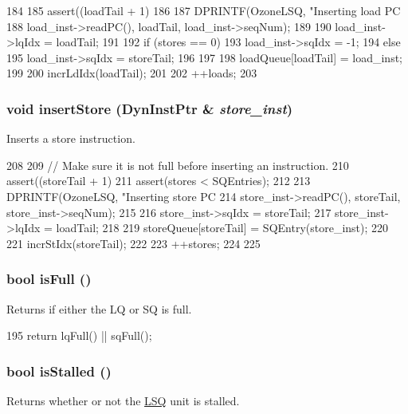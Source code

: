 \begin{DoxyCode}
184 {
185     assert((loadTail + 1) %
186 
187     DPRINTF(OzoneLSQ, "Inserting load PC %
188             load_inst->readPC(), loadTail, load_inst->seqNum);
189 
190     load_inst->lqIdx = loadTail;
191 
192     if (stores == 0) {
193         load_inst->sqIdx = -1;
194     } else {
195         load_inst->sqIdx = storeTail;
196     }
197 
198     loadQueue[loadTail] = load_inst;
199 
200     incrLdIdx(loadTail);
201 
202     ++loads;
203 }
\end{DoxyCode}
\hypertarget{classOzoneLSQ_a6a4b4e51bfff3639932ebaba45e8a282}{
\subsubsection[{insertStore}]{\setlength{\rightskip}{0pt plus 5cm}void insertStore ({\bf DynInstPtr} \& {\em store\_\-inst})}}
\label{classOzoneLSQ_a6a4b4e51bfff3639932ebaba45e8a282}
Inserts a store instruction. 


\begin{DoxyCode}
208 {
209     // Make sure it is not full before inserting an instruction.
210     assert((storeTail + 1) %
211     assert(stores < SQEntries);
212 
213     DPRINTF(OzoneLSQ, "Inserting store PC %
214             store_inst->readPC(), storeTail, store_inst->seqNum);
215 
216     store_inst->sqIdx = storeTail;
217     store_inst->lqIdx = loadTail;
218 
219     storeQueue[storeTail] = SQEntry(store_inst);
220 
221     incrStIdx(storeTail);
222 
223     ++stores;
224 
225 }
\end{DoxyCode}
\hypertarget{classOzoneLSQ_a3e70330939fdfc4dbc2f60c1a660584d}{
\subsubsection[{isFull}]{\setlength{\rightskip}{0pt plus 5cm}bool isFull ()}}
\label{classOzoneLSQ_a3e70330939fdfc4dbc2f60c1a660584d}
Returns if either the LQ or SQ is full. 


\begin{DoxyCode}
195 { return lqFull() || sqFull(); }
\end{DoxyCode}
\hypertarget{classOzoneLSQ_af8eb8590fbfa6ecd2f796390677a4c00}{
\subsubsection[{isStalled}]{\setlength{\rightskip}{0pt plus 5cm}bool isStalled ()}}
\label{classOzoneLSQ_af8eb8590fbfa6ecd2f796390677a4c00}
Returns whether or not the \hyperlink{classLSQ}{LSQ} unit is stalled. 


